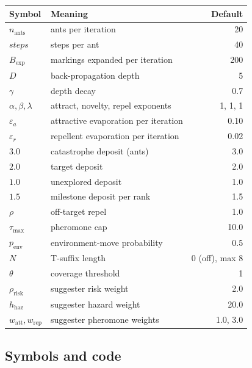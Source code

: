 \documentclass[11pt,a4paper]{article}
\newcommand{\Tau}{\tau_{\max}}
\begin{document}
\begin{center}
\small
\begin{tabular}{@{}llr@{}}
\toprule
Symbol & Meaning & Default \\
\midrule
$n_{\mathrm{ants}}$ & ants per iteration & 20 \\
$\mathit{steps}$ & steps per ant & 40 \\
$B_{\mathrm{exp}}$ & markings expanded per iteration & 200 \\
$D$ & back-propagation depth & 5 \\
$\gamma$ & depth decay & 0.7 \\
$\alpha,\beta,\lambda$ & attract, novelty, repel exponents & 1, 1, 1 \\
$\varepsilon_a$ & attractive evaporation per iteration & 0.10 \\
$\varepsilon_r$ & repellent evaporation per iteration & 0.02 \\
$3.0$ & catastrophe deposit (ants) & 3.0 \\
$2.0$ & target deposit & 2.0 \\
$1.0$ & unexplored deposit & 1.0 \\
$1.5$ & milestone deposit per rank & 1.5 \\
$\rho$ & off-target repel & 1.0 \\
$\Tau$ & pheromone cap & 10.0 \\
$p_{\mathrm{env}}$ & environment-move probability & 0.5 \\
$N$ & T-suffix length & 0 (off), max 8 \\
$\theta$ & coverage threshold & 1 \\
$\rho_{\mathrm{risk}}$ & suggester risk weight & 2.0 \\
$h_{\mathrm{haz}}$ & suggester hazard weight & 20.0 \\
$w_{\mathrm{att}},w_{\mathrm{rep}}$ & suggester pheromone weights & 1.0, 3.0 \\
\bottomrule
\end{tabular}
\end{center}

\subsection{Symbols and code}
\end{document}
